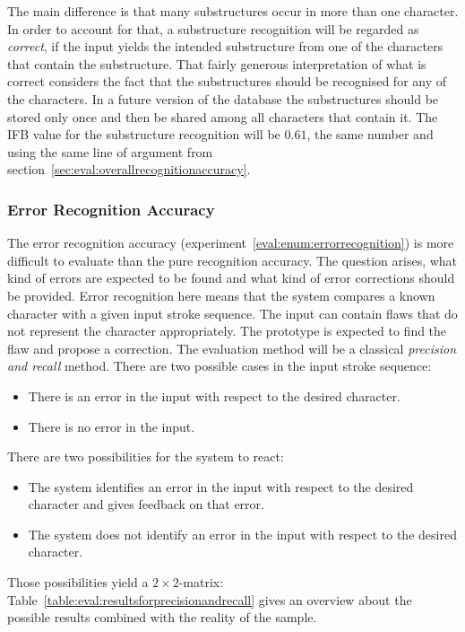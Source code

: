 The main difference is that many substructures occur in more than one 
character. In order to account for that, 
a substructure recognition will be regarded as \emph{correct}, 
if the input yields the intended substructure from
one of the characters that contain the substructure.
That fairly generous interpretation of what is correct considers the fact
that the substructures should be recognised for any of the characters.
In a future version of the database the substructures should be stored only once
and then be shared among all characters that contain it.
The IFB value for the substructure recognition will be \(0.61\), 
the same number and using the same line of argument from 
section~\ref{sec:eval:overallrecognitionaccuracy}.

\subsubsection{Error Recognition Accuracy}
\label{sec:eval:errorrecognitionaccuracy}

The error recognition accuracy (experiment~\ref{eval:enum:errorrecognition}) 
is more difficult to evaluate than the pure recognition accuracy.
The question arises, what kind of errors are expected to be found
and what kind of error corrections should be provided.
Error recognition here means that the system compares a known character with 
a given input stroke sequence. The input can contain flaws that do not 
represent the character appropriately. The prototype is expected to find the flaw
and propose a correction.
The evaluation method will be a classical \emph{precision and recall} method.
There are two possible cases in the input stroke sequence:
\begin{itemize}
  \item There is an error in the input with respect to the desired character.
  \item There is no error in the input.
\end{itemize}
There are two possibilities for the system to react:
\begin{itemize}
  \item The system identifies an error in the input with respect to the desired
        character and gives feedback on that error.
  \item The system does not identify an error in the input with respect to the
        desired character.
\end{itemize}
Those possibilities yield a \(2 \times 2\)-matrix:
Table~\ref{table:eval:resultsforprecisionandrecall} gives an overview about 
the possible results combined with the reality of the sample.

